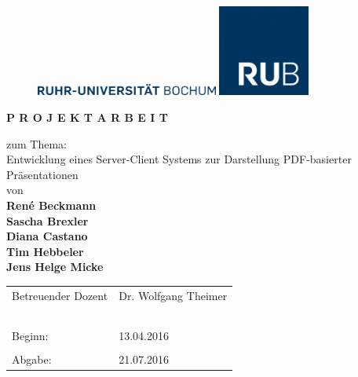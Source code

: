 \thispagestyle{empty}


\begin{figure}[t]
\vspace{-3cm}
\begin{minipage}[t]{3cm}
\vspace{-2cm}
\includegraphics[width=6cm]{Deckblatt/Wortmarke_RUB.jpg}
\end{minipage}
\hfill
\begin{minipage}[t]{3cm}
\includegraphics[width=3cm]{Deckblatt/Label_RUB.jpg}
\end{minipage}
\vspace{3cm}
\end{figure}


\renewcommand{\rmdefault}{phv}
\begin{center}


	{\Huge \bf P R O J E K T A R B E I T}
	
	\vspace{0.5cm}
	
	{\Large
	zum Thema:\\
	\vspace{0.5cm}
	Entwicklung eines Server-Client Systems zur Darstellung PDF-basierter Pr\"asentationen\\
	\vspace{0.5cm}
	von\\
	\vspace{0.5cm}
	{\LARGE \bf
	René Beckmann\\
	Sascha Brexler\\
	Diana Castano\\
	Tim Hebbeler\\
	Jens Helge Micke\\
	}
	\vspace{0.5cm}
	}
\end{center}

\begin{table}[h!]
\begin{tabular}{p{}p{}}
Betreuender Dozent & Dr. Wolfgang Theimer\\
&\\
&\\
&\\
&\\
&\\
Beginn: & 13.04.2016\\
&\\
Abgabe: & 21.07.2016\\
\end{tabular}
\end{table}

\renewcommand{\rmdefault}{ptm}